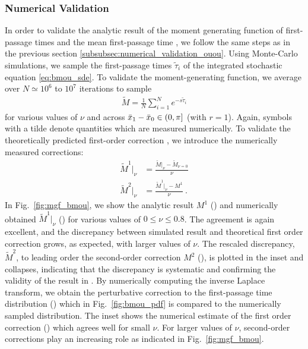\documentclass[%
 reprint,
superscriptaddress,
nofootinbib,
 amsmath,amssymb,
 aps,
prx,
]{revtex4-2}
\begin{document}
\subsubsection{Numerical Validation}
\label{subsubsec:numerical_validation_bmou}
In order to validate the analytic result of the moment generating function of first-passage times  and the mean first-passage time , we follow the same steps as in the previous section \ref{subsubsec:numerical_validation_ouou}. Using Monte-Carlo simulations, we sample the first-passage times $\tilde{\tau}_i$ of the integrated stochastic equation \eqref{eq:bmou_sde}. To validate the moment-generating function, we average over $N\simeq 10^6$ to $10^7$ iterations to sample
\begin{align}
    \tilde{M} = \frac{1}{N}\sum_{i=1}^N e^{-s\tilde{ \tau}_i}
\end{align}
for various values of $\nu$ and across $\bar{x}_1-\bar{x}_0 \in (0,\pi]$ (with $r=1$). Again, symbols with a tilde denote quantities which are measured numerically. To validate the theoretically predicted first-order correction , we introduce the numerically measured corrections:
\begin{align}
    \tilde{M}^1|_{\nu}&= \frac{\tilde{M}|_{\nu}-\tilde{M}_{\nu=0}}{\nu} 
    \label{eq:def_cM1_bmou}\\
    \tilde{M}^2|_{\nu} &= \frac{\tilde{M}^1|_{\nu}-M^1}{\nu} ~.
    \label{eq:def_cM2_bmou}
\end{align}
In Fig.~\ref{fig:mgf_bmou}, we show the analytic result $M^1$ (\cf {}) and numerically obtained $\tilde{M}^1|_{\nu}$ (\cf {}) for various values of $0 \leq \nu \leq 0.8$. The agreement is again excellent, and the discrepancy between simulated result and theoretical first order correction grows, as expected, with larger values of $\nu$. The rescaled discrepancy, $\tilde{M}^2$, to leading order the second-order correction $M^2$ (\cf {}), is plotted in the inset and collapses, indicating that the discrepancy is systematic and confirming the validity of the result in .  By numerically computing the inverse Laplace transform, we obtain the perturbative correction to the first-passage time distribution (\cf {}) which in Fig.~\ref{fig:bmou_pdf} is compared to the numerically sampled distribution.
The inset shows the numerical estimate of the first order correction (\cf {}) which agrees well for small $\nu$. For larger values of $\nu$, second-order corrections play an increasing role as indicated in Fig.~\ref{fig:mgf_bmou}.
\end{document}

